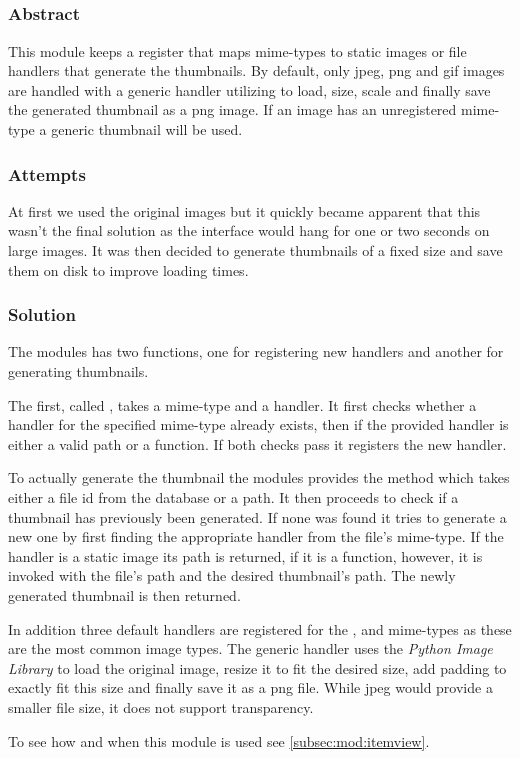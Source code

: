 \subsection{}
\label{sub:mod:thumbnail}
\def\kapitelautor{Clemens Stadlbauer}

\subsubsection{Abstract}

This module keeps a register that maps mime-types to static images or file
handlers that generate the thumbnails. By default, only jpeg, png and gif
images are handled with a generic handler utilizing 
\cite{pil} to load, size, scale and finally save the generated thumbnail as a
png image. If an image has an unregistered mime-type a generic thumbnail will be
used.

\subsubsection{Attempts}

At first we used the original images but it quickly became apparent that this
wasn't the final solution as the interface would hang for one or two seconds on
large images. It was then decided to generate thumbnails of a fixed size and
save them on disk to improve loading times.

\subsubsection{Solution} %

The modules has two functions, one for registering new handlers and another for
generating thumbnails.

The first, called , takes a mime-type and a handler. It first
checks whether a handler for the specified mime-type already exists, then if
the provided handler is either a valid path or a function. If both checks pass
it registers the new handler.

To actually generate the thumbnail the modules provides the
 method which takes either a file id from the database or
a path. It then proceeds to check if a thumbnail has previously been generated.
If none was found it tries to generate a new one by first finding the
appropriate handler from the file's mime-type. If the handler is a static image
its path is returned, if it is a function, however, it is invoked with the
file's path and the desired thumbnail's path. The newly generated thumbnail is
then returned.

In addition three default handlers are registered for the ,
 and  mime-types as these are the most
common image types. The generic handler uses the \emph{Python Image
Library} to load the original image, resize it to fit the desired
size, add padding to exactly fit this size and finally save it as a png file.
While jpeg would provide a smaller file size, it does not support transparency.

To see how and when this module is used see \cref{subsec:mod:itemview}.
